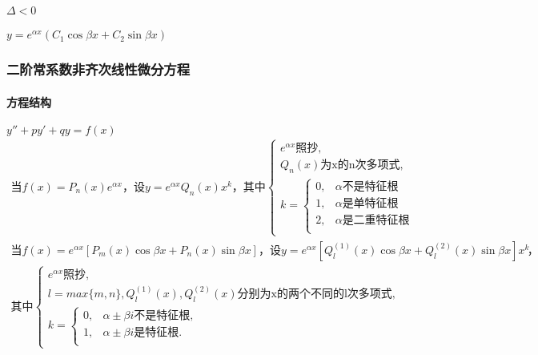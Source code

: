 ﻿\documentclass[a4paper,12pt,UTF8]{ctexart}
\begin{document}
    \paragraph{\(\Delta<0\)} \(y=e^{\alpha x}(C_1\cos\beta x+C_2\sin\beta x)\)
    
    \subsubsection{二阶常系数非齐次线性微分方程}
    \paragraph{方程结构} \(y''+py'+qy=f(x)\)
    \begin{align*}
        \text{当} f(x)=P_n(x)e^{\alpha x} \text{，设} y=e^{\alpha x}Q_n(x)x^k \text{，其中}
        \begin{cases}
            e^{\alpha x}\text{照抄},\\
            Q_n(x)\text{为x的n次多项式},\\
            k=
            \begin{cases}
                0, &\alpha\text{不是特征根}\\
                1, &\alpha\text{是单特征根}\\
                2, &\alpha\text{是二重特征根}\\
            \end{cases} 
        \end{cases} 
    \end{align*}
    \begin{align*}
        \text{当} f(x)=e^{\alpha x}\left[P_m(x)\cos \beta x + P_n(x)\sin \beta x\right] \text{，设} y=e^{\alpha x} \left[Q_l^{(1)}(x)\cos \beta x + Q_l^{(2)}(x)\sin \beta x\right]x^k& \text{，}\\
        \text{其中}
        \begin{cases}
            e^{\alpha x}\text{照抄},\\
            l=max\{m,n\},Q_l^{(1)}(x),Q_l^{(2)}(x)\text{分别为x的两个不同的l次多项式},\\
            k=
            \begin{cases}
                0, &\alpha\pm\beta i \text{不是特征根},\\
                1, &\alpha\pm\beta i \text{是特征根}.\\
            \end{cases} 
        \end{cases}
    \end{align*}
\end{document}
